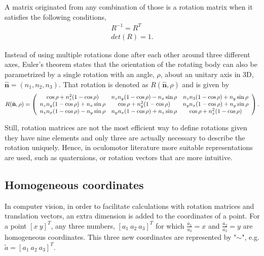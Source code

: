 A matrix originated from any combination of those is a rotation matrix when it satisfies the following conditions,
\begin{align}
	\label{epwifneprnf}
	R^{-1} = R^T\\
	\label{ienvpirnf}
	det(R) = 1.
\end{align} 

Instead of using multiple rotations done after each other around three different axes, Euler's theorem states that the orientation of the rotating body can also be parametrized by a single rotation with an angle, $\rho$, about an unitary axis in 3D, $\hat{\mathbf{n}} = (n_1, n_2, n_3)$. That rotation is denoted as $R(\hat{\mathbf{n}}, \rho)$ and is given by 
\begin{equation}
R ( \hat { \mathbf{n} } , \rho ) = \left( \begin{array} { c c c } { \cos \rho + n _ { z } ^ { 2 } ( 1 - \cos \rho ) } & { n _ { z } n _ { y } ( 1 - \cos \rho ) - n _ { x } \sin \rho } & { n _ { z } n _ { 3 } ( 1 - \cos \rho ) + n _ { y } \sin \rho } \\ { n _ { z } n _ { y } ( 1 - \cos \rho ) + n _ { x } \sin \rho } & { \cos \rho + n _ { y } ^ { 2 } ( 1 - \cos \rho ) } & { n _ { y } n _ { x } ( 1 - \cos \rho ) + n _ { y } \sin \rho } \\ { n _ { z } n _ { x } ( 1 - \cos \rho ) - n _ { y } \sin \rho } & { n _ { y } n _ { x } ( 1 - \cos \rho ) + n _ { z } \sin \rho } & { \cos \rho + n _ { x } ^ { 2 } ( 1 - \cos \rho ) } \end{array} \right).
\end{equation}

Still, rotation matrices are not the most efficient way to define rotations given they have nine elements and only three are actually necessary to describe the rotation uniquely. Hence, in oculomotor literature more suitable representations are used, such as quaternions, or rotation vectors that are more intuitive. \cite{rep}\cite{mathrot}

\subsection{Homogeneous coordinates}
\label{homo}
In computer vision, in order to facilitate calculations with rotation matrices and translation vectors, an extra dimension is added to the coordinates of a point. 
For a point $[x \ y]^T$, any three numbers, $[a_1 \ a_2 \ a_3]^T$ for which $\frac{a_1}{a_3} = x$ and $\frac{a_2}{a_3} = y$ are homogeneous coordinates. This three new coordinates are represented by "$\sim$", e.g. $\widetilde{a} = [a_1 \ a_2 \ a_3]^T$.


